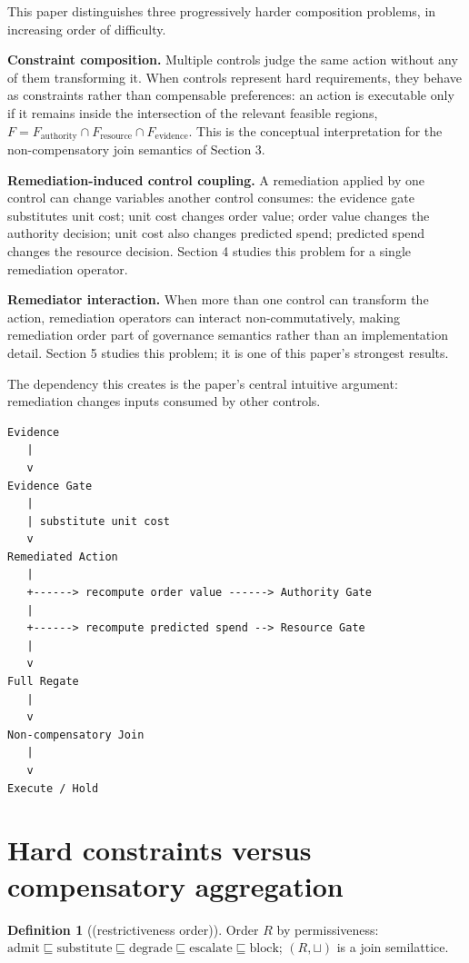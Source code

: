 \documentclass[11pt,a4paper]{article}
\theoremstyle{definition}
\newtheorem{definition}{Definition}
\begin{document}
This paper distinguishes three progressively harder composition problems, in increasing order of difficulty.

\noindent\textbf{Constraint composition.} Multiple controls judge the same action without any of them transforming it. When controls represent hard requirements, they behave as constraints rather than compensable preferences: an action is executable only if it remains inside the intersection of the relevant feasible regions, $F = F_{\mathrm{authority}} \cap F_{\mathrm{resource}} \cap F_{\mathrm{evidence}}$. This is the conceptual interpretation for the non-compensatory join semantics of Section 3.

\noindent\textbf{Remediation-induced control coupling.} A remediation applied by one control can change variables another control consumes: the evidence gate substitutes unit cost; unit cost changes order value; order value changes the authority decision; unit cost also changes predicted spend; predicted spend changes the resource decision. Section 4 studies this problem for a single remediation operator.

\noindent\textbf{Remediator interaction.} When more than one control can transform the action, remediation operators can interact non-commutatively, making remediation order part of governance semantics rather than an implementation detail. Section 5 studies this problem; it is one of this paper's strongest results.

The dependency this creates is the paper's central intuitive argument: remediation changes inputs consumed by other controls.

\begin{verbatim}
Evidence
   |
   v
Evidence Gate
   |
   | substitute unit cost
   v
Remediated Action
   |
   +------> recompute order value ------> Authority Gate
   |
   +------> recompute predicted spend --> Resource Gate
   |
   v
Full Regate
   |
   v
Non-compensatory Join
   |
   v
Execute / Hold
\end{verbatim}

\section{Hard constraints versus compensatory aggregation}

\setcounter{definition}{0}
\begin{definition}[(restrictiveness order)]
Order $R$ by permissiveness: $\mathrm{admit} \sqsubseteq \mathrm{substitute} \sqsubseteq \mathrm{degrade} \sqsubseteq \mathrm{escalate} \sqsubseteq \mathrm{block}$; $(R, \sqcup)$ is a join semilattice.
\end{definition}
\end{document}
